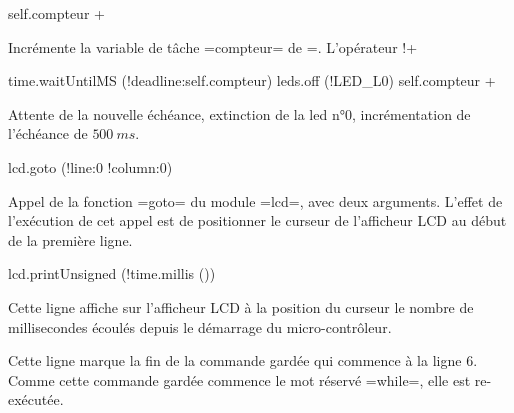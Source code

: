\begin{PLM}[8]
    self.compteur +%
\end{PLM}

Incrémente la variable de tâche \plm=compteur= de =. L'opérateur \plm!+%


\begin{PLM}[9]
    time.waitUntilMS (!deadline:self.compteur)
    leds.off (!LED_L0)
    self.compteur +%
\end{PLM}

Attente de la nouvelle échéance, extinction de la led n°0, incrémentation de l'échéance de $500~ms$.


\begin{PLM}[12]
    lcd.goto (!line:0 !column:0)
\end{PLM}

Appel de la fonction \plm=goto= du module \plm=lcd=, avec deux arguments. L'effet de l'exécution de cet appel est de positionner le curseur de l'afficheur LCD au début de la première ligne.




\begin{PLM}[13]
    lcd.printUnsigned (!time.millis ())
\end{PLM}

Cette ligne affiche sur l'afficheur LCD à la position du curseur le nombre de millisecondes écoulés depuis le démarrage du micro-contrôleur.






\begin{PLM}[14]
  }
\end{PLM}

Cette ligne marque la fin de la commande gardée qui commence à la ligne $6$. Comme cette commande gardée commence le mot réservé \plm=while=, elle est re-exécutée.


